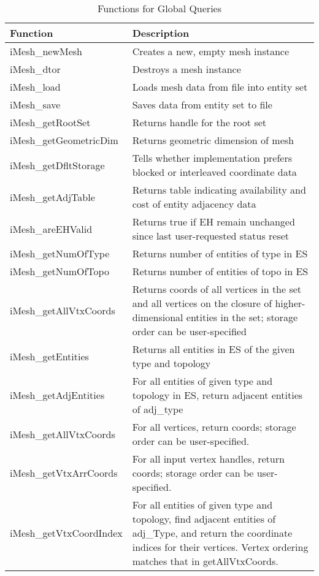 %
\begin{table}

\caption{Functions for Global Queries}

\label{table:Mesh-Int} \begin{tabular}{|p{1.25in}|p{223pt}|}
\hline 
{\small Function}&
{\small Description}\tabularnewline
\hline
\hline 
{\small iMesh\_newMesh}&
{\small Creates a new, empty mesh instance}\tabularnewline
\hline 
{\small iMesh\_dtor}&
{\small Destroys a mesh instance}\tabularnewline
\hline 
{\small iMesh\_load}&
{\small Loads mesh data from file into entity set}\tabularnewline
\hline 
{\small iMesh\_save}&
{\small Saves data from entity set to file}\tabularnewline
\hline 
{\small iMesh\_getRootSet}&
{\small Returns handle for the root set}\tabularnewline
\hline 
{\small iMesh\_getGeometricDim}&
{\small Returns geometric dimension of mesh}\tabularnewline
\hline 
{\small iMesh\_getDfltStorage}&
{\small Tells whether implementation prefers blocked or interleaved
coordinate data}\tabularnewline
\hline 
{\small iMesh\_getAdjTable}&
{\small Returns table indicating availability and cost of entity adjacency
data}\tabularnewline
\hline 
{\small iMesh\_areEHValid}&
{\small Returns true if EH remain unchanged since last user-requested
status reset}\tabularnewline
\hline
\hline 
{\small iMesh\_getNumOfType}&
{\small Returns number of entities of type in ES}\tabularnewline
\hline 
{\small iMesh\_getNumOfTopo}&
{\small Returns number of entities of topo in ES}\tabularnewline
\hline 
{\small iMesh\_getAllVtxCoords}&
{\small Returns coords of all vertices in the set and all vertices
on the closure of higher-dimensional entities in the set; storage
order can be user-specified}\tabularnewline
\hline 
{\small iMesh\_getEntities}&
{\small Returns all entities in ES of the given type and topology}\tabularnewline
\hline 
{\small iMesh\_getAdjEntities}&
{\small For all entities of given type and topology in ES, return
adjacent entities of adj\_type}\tabularnewline
\hline 
{\small iMesh\_getAllVtxCoords}&
{\small For all vertices, return coords; storage order can be user-specified.}\tabularnewline
\hline 
{\small iMesh\_getVtxArrCoords}&
{\small For all input vertex handles, return coords; storage order
can be user-specified.}\tabularnewline
\hline 
{\small iMesh\_getVtxCoordIndex}&
{\small For all entities of given type and topology, find adjacent
entities of adj\_Type, and return the coordinate indices for their
vertices. Vertex ordering matches that in getAllVtxCoords.}\tabularnewline
\hline
\end{tabular}
\end{table}


